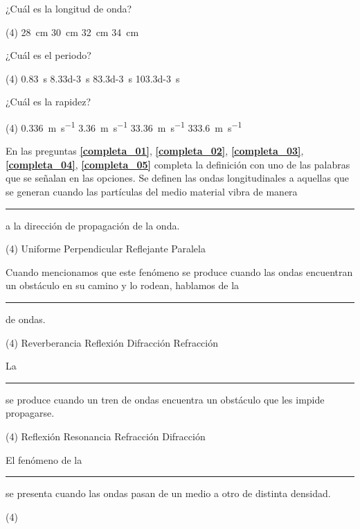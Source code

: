 \documentclass[12pt, letter]{exam}
\begin{document}
\begin{questions}
    \question \label{completa_grafica_02} ¿Cuál es la longitud de onda?
    \begin{tasks}(4)
        \task \SI{28}{\centi\meter}
        \task \SI{30}{\centi\meter}
        \task \SI{32}{\centi\meter}
        \task \SI{34}{\centi\meter}
    \end{tasks}
    \question \label{completa_grafica_03} ¿Cuál es el periodo?
    \begin{tasks}(4)
        \task \SI{0.83}{\second}
        \task \SI{8.33d-3}{\second}
        \task \SI{83.3d-3}{\second}
        \task \SI{103.3d-3}{\second}
    \end{tasks}
    \question \label{completa_grafica_04} ¿Cuál es la rapidez?
    \begin{tasks}(4)
        \task \SI{0.336}{\meter\per\second}
        \task \SI{3.36}{\meter\per\second}
        \task \SI{33.36}{\meter\per\second}
        \task \SI{333.6}{\meter\per\second}
    \end{tasks}
    En las preguntas \textbf{\ref{completa_01}}, \textbf{\ref{completa_02}}, \textbf{\ref{completa_03}}, \textbf{\ref{completa_04}}, \textbf{\ref{completa_05}} completa la definición con uno de las palabras que se señalan en las opciones.
    \question \label{completa_01} Se definen las ondas longitudinales a aquellas que se generan cuando las partículas del medio material vibra de manera \rule{2cm}{0.3mm} a la dirección de propagación de la onda.
    \begin{tasks}(4)
        \task Uniforme
        \task Perpendicular
        \task Reflejante
        \task Paralela
    \end{tasks}
    \question \label{completa_02} Cuando mencionamos que este fenómeno se produce cuando las ondas encuentran un obstáculo en su camino y lo rodean, hablamos de la \rule{2cm}{0.3mm} de ondas.
    \begin{tasks}(4)
        \task Reverberancia
        \task Reflexión
        \task Difracción
        \task Refracción
    \end{tasks}
    \question \label{completa_03} La \rule{2cm}{0.3mm} se produce cuando un tren de ondas encuentra un obstáculo que les impide propagarse.
    \begin{tasks}(4)
        \task Reflexión
        \task Resonancia
        \task Refracción
        \task Difracción
    \end{tasks}
    \question \label{completa_04} El fenómeno de la \rule{2cm}{0.3mm} se presenta cuando las ondas pasan de un medio a otro de distinta densidad.
    \begin{tasks}(4)

\end{tasks}
\end{questions}
\end{document}
